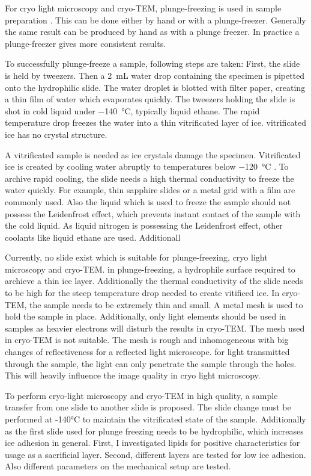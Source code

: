 For cryo light microscopy and cryo-TEM, plunge-freezing is used in sample preparation \cite{Danino.2012} \cite{Faoro.2018}. This can be done either by hand or with a plunge-freezer. Generally the same result can be produced by hand as with a plunge freezer. In practice a plunge-freezer gives more consistent results.

To successfully plunge-freeze a sample, following steps are taken: First, the slide is held by tweezers. Then a \SI{2}{\milli\liter} water drop containing the specimen is pipetted onto the hydrophilic slide. The water droplet is blotted with filter paper, creating a thin film of water which evaporates quickly. The tweezers holding the slide is shot in cold liquid under \SI{-140}{\degreeCelsius}, typically liquid ethane. The rapid temperature drop freezes the water into a thin vitrificated layer of ice. vitrificated ice has no crystal structure.

A vitrificated sample is needed as ice crystals damage the specimen. Vitrificated ice is created by cooling water abruptly to temperatures below \SI{-120}{\degreeCelsius} \cite{Wowk.2010}. To archive rapid cooling, the slide needs a high thermal conductivity to freeze the water quickly. For example, thin sapphire slides or a metal grid with a film are commonly used. Also the liquid which is used to freeze the sample should not possess the Leidenfrost effect, which prevents instant contact of the sample with the cold liquid. As liquid nitrogen is possessing the Leidenfrost effect, other coolants like liquid ethane are used. Additionall

Currently, no slide exist which is suitable for plunge-freezing, cryo light microscopy and cryo-TEM. in plunge-freezing, a hydrophile surface required to archieve a thin ice layer. Additionally the thermal conductivity of the slide needs to be high for the steep temperature drop needed to create vitificed ice. In cryo-TEM, the sample needs to be extremely thin and small. A metal mesh is used to hold the sample in place. Additionally, only light elements should be used in samples as heavier electrons will disturb the results in cryo-TEM. The mesh used in cryo-TEM is not suitable. The mesh is rough and inhomogeneous with big changes of reflectiveness for a reflected light microscope. for light transmitted through the sample, the light can only penetrate the sample through the holes. This will heavily influence the image quality in cryo light microscopy.
 
To perform cryo-light microscopy and cryo-TEM in high quality, a sample transfer from one slide to another slide is proposed. The slide change must be performed at -140°C to maintain the vitrificated state of the sample. Additionally as the first slide used for plunge freezing needs to be hydrophilic, which increases ice adhesion in general. First, I investigated lipids for positive characteristics for usage as a sacrificial layer. Second, different layers are tested for low ice adhesion. Also different parameters on the mechanical setup are tested.

